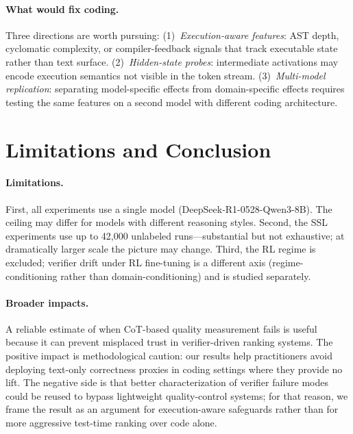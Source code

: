 \documentclass{article}
\begin{document}
\paragraph{What would fix coding.} Three directions are worth pursuing: (1)~\emph{Execution-aware features}: AST depth, cyclomatic complexity, or compiler-feedback signals that track executable state rather than text surface. (2)~\emph{Hidden-state probes}: intermediate activations may encode execution semantics not visible in the token stream. (3)~\emph{Multi-model replication}: separating model-specific effects from domain-specific effects requires testing the same features on a second model with different coding architecture.

\section{Limitations and Conclusion}
\label{sec:limits}

\paragraph{Limitations.} First, all experiments use a single model (DeepSeek-R1-0528-Qwen3-8B). The ceiling may differ for models with different reasoning styles. Second, the SSL experiments use up to 42,000 unlabeled runs---substantial but not exhaustive; at dramatically larger scale the picture may change. Third, the RL regime is excluded; verifier drift under RL fine-tuning is a different axis (regime-conditioning rather than domain-conditioning) and is studied separately.

\paragraph{Broader impacts.} A reliable estimate of when CoT-based quality measurement fails is useful because it can prevent misplaced trust in verifier-driven ranking systems. The positive impact is methodological caution: our results help practitioners avoid deploying text-only correctness proxies in coding settings where they provide no lift. The negative side is that better characterization of verifier failure modes could be reused to bypass lightweight quality-control systems; for that reason, we frame the result as an argument for execution-aware safeguards rather than for more aggressive test-time ranking over code alone.
\end{document}
